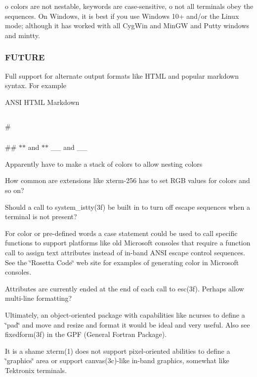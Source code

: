 o colors are not nestable, keywords are case-\/sensitive, o not all terminals obey the sequences. On Windows, it is best if you use Windows 10+ and/or the Linux mode; although it has worked with all Cyg\+Win and Min\+GW and Putty windows and mintty.

\subsubsection*{F\+U\+T\+U\+RE}

Full support for alternate output formats like H\+T\+ML and popular markdown syntax. For example

A\+N\+SI H\+T\+ML Markdown \subsection*{}

\# \subsubsection*{}

\#\# {\bfseries } $\ast$$\ast$ and $\ast$$\ast$ {\itshape } \+\_\+\+\_\+ and \+\_\+\+\_\+

Apparently have to make a stack of colors to allow nesting colors

How common are extensions like xterm-\/256 has to set R\+GB values for colors and so on?

Should a call to system\+\_\+istty(3f) be built in to turn off escape sequences when a terminal is not present?

For color or pre-\/defined words a case statement could be used to call specific functions to support platforms like old Microsoft consoles that require a function call to assign text attributes instead of in-\/band A\+N\+SI escape control sequences. See the \char`\"{}\+Rosetta Code\char`\"{} web site for examples of generating color in Microsoft consoles.

Attributes are currently ended at the end of each call to esc(3f). Perhaps allow multi-\/line formatting?

Ultimately, an object-\/oriented package with capabilities like ncurses to define a \char`\"{}pad\char`\"{} and move and resize and format it would be ideal and very useful. Also see fixedform(3f) in the G\+PF (General Fortran Package).

It is a shame xterm(1) does not support pixel-\/oriented abilities to define a \char`\"{}graphics\char`\"{} area or support canvas(3c)-\/like in-\/band graphics, somewhat like Tektronix terminals.

